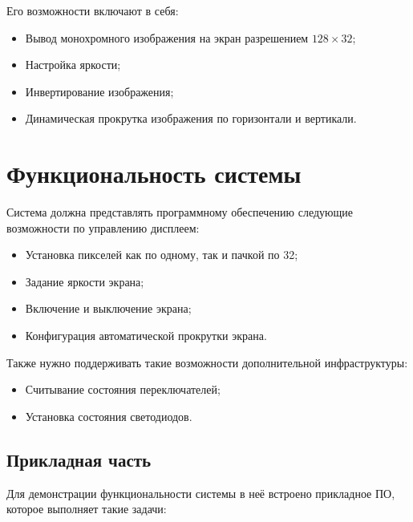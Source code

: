 \documentclass[12pt, a4paper] {ncc}
\begin{document}
Его возможности включают в себя:

\begin{itemize}
        \item Вывод монохромного изображения на экран разрешением $128 \times
                32$;
        \item Настройка яркости;
        \item Инвертирование изображения;
        \item Динамическая прокрутка изображения по горизонтали и вертикали.
\end{itemize}

\section{Функциональность системы}

Система должна представлять программному обеспечению следующие возможности по
управлению дисплеем:

\begin{itemize}
        \item Установка пикселей как по одному, так и пачкой по 32;
        \item Задание яркости экрана;
        \item Включение и выключение экрана;
        \item Конфигурация автоматической прокрутки экрана.
\end{itemize}

Также нужно поддерживать такие возможности дополнительной инфраструктуры:

\begin{itemize}
        \item Считывание состояния переключателей;
        \item Установка состояния светодиодов.
\end{itemize}

\subsection{Прикладная часть}

Для демонстрации функциональности системы в неё встроено прикладное ПО, которое
выполняет такие задачи:
\end{document}
